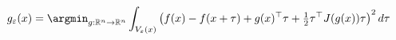 




\[
g_{\varepsilon}(x) = \argmin_{g:\mathbb{R}^n \rightarrow \mathbb{R}^n}\int_{ V_\varepsilon(x)} \left(f(x) - f(x + \tau) + g(x)^\top\tau  + \tfrac{1}{2}\tau^\top J(g(x)) \tau \right)^2 d\tau
\]